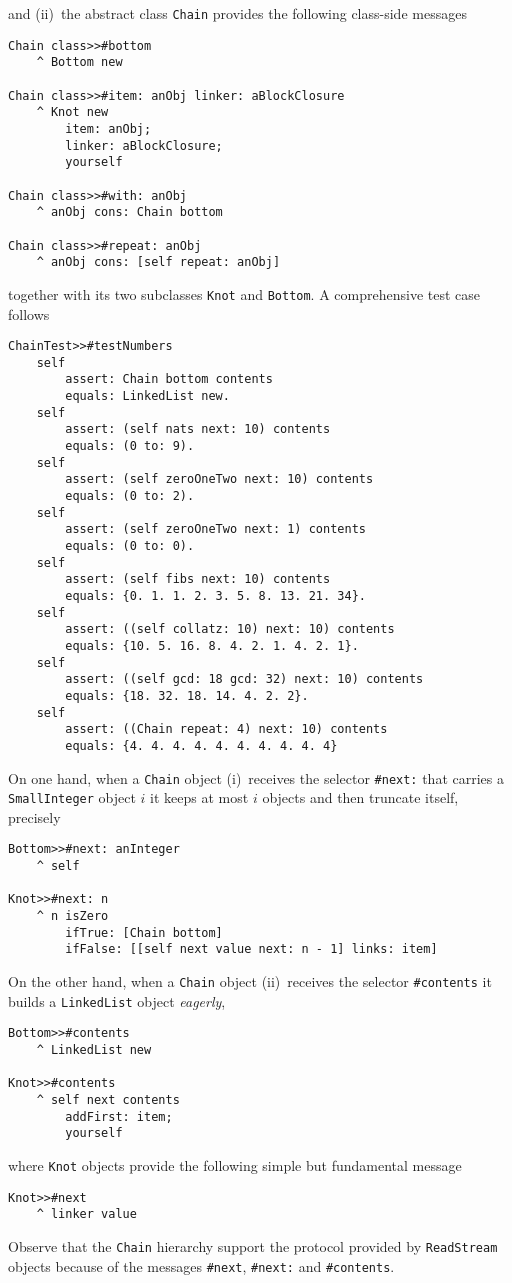 \documentclass[a4paper,12pt]{article}
\begin{document}
and (ii)~the abstract class \Verb|Chain| provides the following class-side messages
\begin{verbatim}
Chain class>>#bottom
    ^ Bottom new

Chain class>>#item: anObj linker: aBlockClosure
    ^ Knot new
        item: anObj;
        linker: aBlockClosure;
        yourself

Chain class>>#with: anObj
    ^ anObj cons: Chain bottom

Chain class>>#repeat: anObj
    ^ anObj cons: [self repeat: anObj]
\end{verbatim}
together with its two subclasses \Verb|Knot| and \Verb|Bottom|. A comprehensive
test case follows
\begin{verbatim}
ChainTest>>#testNumbers
    self
        assert: Chain bottom contents
        equals: LinkedList new.
    self
        assert: (self nats next: 10) contents
        equals: (0 to: 9).
    self
        assert: (self zeroOneTwo next: 10) contents
        equals: (0 to: 2).
    self
        assert: (self zeroOneTwo next: 1) contents
        equals: (0 to: 0).
    self
        assert: (self fibs next: 10) contents
        equals: {0. 1. 1. 2. 3. 5. 8. 13. 21. 34}.
    self
        assert: ((self collatz: 10) next: 10) contents
        equals: {10. 5. 16. 8. 4. 2. 1. 4. 2. 1}.
    self
        assert: ((self gcd: 18 gcd: 32) next: 10) contents
        equals: {18. 32. 18. 14. 4. 2. 2}.
    self
        assert: ((Chain repeat: 4) next: 10) contents
        equals: {4. 4. 4. 4. 4. 4. 4. 4. 4. 4}
\end{verbatim}

On one hand, when a \Verb|Chain| object (i)~receives the selector
\Verb|#next:| that carries a \Verb|SmallInteger| object $i$ it keeps at most
$i$ objects and then truncate itself, precisely
\begin{verbatim}
Bottom>>#next: anInteger
    ^ self

Knot>>#next: n
    ^ n isZero
        ifTrue: [Chain bottom]
        ifFalse: [[self next value next: n - 1] links: item]
\end{verbatim}

On the other hand, when a \Verb|Chain| object (ii)~receives the selector
\Verb|#contents| it builds a \Verb|LinkedList| object \textit{eagerly},
\begin{verbatim}
Bottom>>#contents
    ^ LinkedList new

Knot>>#contents
    ^ self next contents
        addFirst: item;
        yourself
\end{verbatim}
where \Verb|Knot| objects provide the following simple but fundamental message
\begin{verbatim}
Knot>>#next
    ^ linker value
\end{verbatim}
Observe that the \Verb|Chain| hierarchy support the protocol provided
by \Verb|ReadStream| objects because of the messages \Verb|#next|, \Verb|#next:|
and \Verb|#contents|.
\end{document}
